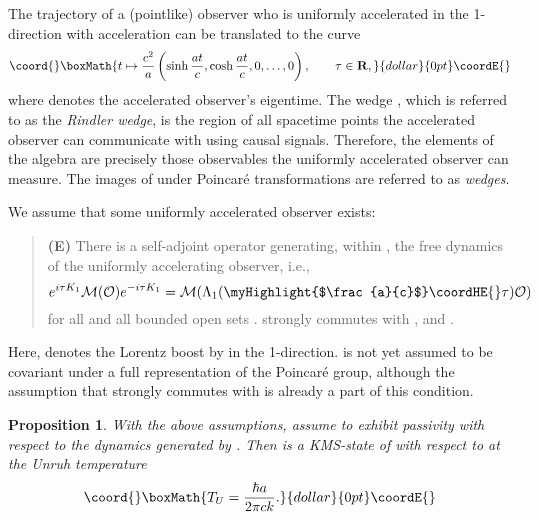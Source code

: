 \documentclass[a4paper,11pt]{article}
\newtheorem{proposition}[theorem]{Proposition}{\bf}{\it}
\def\dt{\cal}
\def\dM{{\dt M}}
\def\O{{\cal O}}
\def\gO{\Omega}
\def\go{\omega}
\def\Rd{\reals^{1+s}}
\def\reals{{\bf R}}
\begin{document}
The trajectory of a (pointlike) observer who is uniformly accelerated
in the 1-direction with acceleration \coordHE{} can be translated to the
curve
$$\coord{}\boxMath{t\mapsto\frac{c^2}{a}\left(\sinh\frac{at}{c},
\cosh\frac{at}{c},0,\dots,0\right),\qquad\tau\in\reals,}{dollar}{0pt}\coordE{}$$
where \myHighlight{$t\in\reals$}\coordHE{}
denotes the accelerated observer's eigentime. The wedge
\myHighlight{$W_1:=\{x\in\Rd:\,x_1>|x_0|\}$}\coordHE{}, which is referred to as the {\em
Rindler wedge}, is the region of all spacetime points the accelerated
observer can communicate with using causal signals. Therefore, the
elements of the algebra \myHighlight{$\dM(W_1)$}\coordHE{} are precisely those observables the
uniformly accelerated observer can measure. The images of \coordHE{} under
Poincar\'e transformations are referred to as {\em wedges}.

We assume that some uniformly accelerated observer exists:
\begin{quote}
{\bf (E)} There is a self-adjoint operator
\coordHE{} generating, within \coordHE{}, the free dynamics of the uniformly
accelerating observer, i.e., $$e^{i\tau K_1}\dM(\O)e^{-i\tau
K_1}=\dM(\Lambda_1(\mbox{\myHighlight{$\frac{a}{c}$}\coordHE{}}\tau)\O)$$ for all \myHighlight{$\tau\in\reals$}\coordHE{} and
all bounded open sets \myHighlight{$\O\subset W_1$}\coordHE{}.
\coordHE{} strongly commutes with \coordHE{}, and \myHighlight{$K_1\gO=0$}\coordHE{}.
\end{quote}
Here, \coordHE{} denotes the Lorentz boost by
\coordHE{} in the 1-direction.
\myHighlight{$\dM$}\coordHE{} is not yet assumed to be
covariant under a full representation of the Poincar\'e group,
although the assumption that \coordHE{} strongly commutes with
\coordHE{} is already a part of this condition.

\begin{proposition}%
With the above assumptions, assume \myHighlight{$\go$}\coordHE{} to exhibit passivity with respect
to the dynamics generated by \coordHE{}. Then \myHighlight{$\go$}\coordHE{}
is a KMS-state of \myHighlight{$\dM(W_1)$}\coordHE{} with respect to \coordHE{} at
the Unruh temperature
$$\coord{}\boxMath{T_U=\frac{\hbar a}{2\pi ck}.}{dollar}{0pt}\coordE{}$$
\end{proposition}
\end{document}

